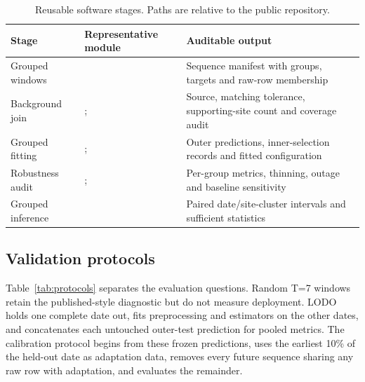 \documentclass[review,12pt,authoryear]{elsarticle}
\begin{document}
\begin{table}[H]
\centering
\caption{Reusable software stages. Paths are relative to the public repository.}
\label{tab:software-workflow}
\begin{adjustbox}{max width=\textwidth}
\begin{tabular}{P{2.5cm}P{6.0cm}P{6.6cm}}
\toprule
Stage & Representative module & Auditable output \\
\midrule
Grouped windows &  & Sequence manifest with groups, targets and raw-row membership \\
Background join & ;  & Source, matching tolerance, supporting-site count and coverage audit \\
Grouped fitting & ;  & Outer predictions, inner-selection records and fitted configuration \\
Robustness audit & ;  & Per-group metrics, thinning, outage and baseline sensitivity \\
Grouped inference &  & Paired date/site-cluster intervals and sufficient statistics \\
\bottomrule
\end{tabular}
\end{adjustbox}
\end{table}

\subsection{Validation protocols}

Table~\ref{tab:protocols} separates the evaluation questions. Random T=7
windows retain the published-style diagnostic but do not measure deployment.
LODO holds one complete date out, fits preprocessing and estimators on the
other dates, and concatenates each untouched outer-test prediction for pooled
metrics. The calibration protocol begins from these frozen predictions, uses
the earliest 10\% of the held-out date as adaptation data, removes every future
sequence sharing any raw row with adaptation, and evaluates the remainder.
\end{document}
